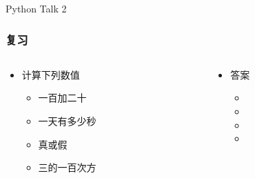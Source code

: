 


\begin{CJK}{UTF8}{gbsn}

\PreFirstFrame
\begin{frame} [fragile]
	\centerline{\fontsize{42}{42}\selectfont Python Talk 2}
\end{frame}
\PostFirstFrame

\begin{frame} [fragile]
	\frametitle{复习}
	\linespread{2}
	\begin{columns}[T]
		\begin{column}[T]{.5\textwidth}
			\begin{itemize}
			\item 计算下列数值
				\begin{itemize}
				\item 一百加二十
				\item 一天有多少秒
				\item 真或假
				\item 三的一百次方
				\end{itemize}
			\end{itemize}
		\end{column}
		\begin{column}[T]{.5\textwidth}
			\begin{itemize}
			\item 答案
				\begin{itemize}
				\item {}
				\item {}
				\item {}
				\item {}
				\end{itemize}
			\end{itemize}
		\end{column}
	\end{columns}
\end{frame}


\end{CJK}
